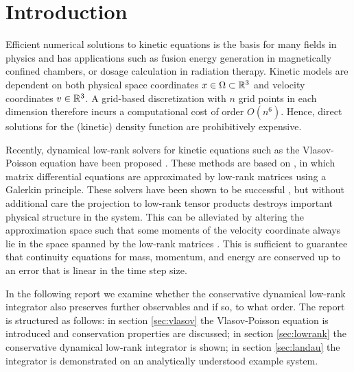 
\section{Introduction}\label{sec:intro}

Efficient numerical solutions to kinetic equations is the basis for many fields in 
physics and has applications such as fusion energy generation in magnetically confined 
chambers, or dosage calculation in radiation therapy. Kinetic models are dependent on 
both physical space coordinates $x \in \Omega \subset \mathbb{R}^3$ and velocity coordinates 
$v \in \mathbb{R}^3$. A grid-based discretization with $n$ grid points in each dimension 
therefore incurs a computational cost of order $O(n^6)$. Hence, direct solutions for the 
(kinetic) density function are prohibitively expensive. 

Recently, dynamical low-rank solvers for kinetic equations such as the Vlasov-Poisson 
equation have been proposed \cite{einkemmer2018}. These methods are based on 
\cite{lowrank}, in which matrix differential equations are approximated by low-rank 
matrices using a Galerkin principle. These solvers have been shown to be successful 
\cite{Cassini_2022}, but without additional care the projection to low-rank tensor 
products destroys important physical structure in the system. This can be alleviated by 
altering the approximation space such that some moments of the velocity coordinate always 
lie in the space spanned by the low-rank matrices \cite{robustlowrank}. This is sufficient 
to guarantee that continuity equations for mass, momentum, and energy are conserved up to 
an error that is linear in the time step size. 

In the following report we examine whether the conservative dynamical low-rank integrator 
also preserves further observables and if so, to what order. The report is structured as 
follows: in section \ref{sec:vlasov} the Vlasov-Poisson equation is introduced and 
conservation properties are discussed; in section \ref{sec:lowrank} the conservative 
dynamical low-rank integrator is shown; in section \ref{sec:landau} the integrator is 
demonstrated on an analytically understood example system. 

